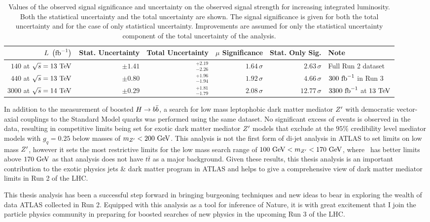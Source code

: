 \begin{table}[htbp]
 \centering
 \caption[Values of the observed signal significance and uncertainty on the observed signal strength for increasing integrated luminosity.]{%
  Values of the observed signal significance and uncertainty on the observed signal strength for increasing integrated luminosity.
  Both the statistical uncertainty and the total uncertainty are shown.
  The signal significance is given for both the total uncertainty and for the case of only statistical uncertainty.
  Improvements are assumed for only the statistical uncertainty component of the total uncertainty of the analysis.}
 \label{table:signal_significance_lumi_scaling}
 \begin{adjustbox}{max width=\textwidth}
  \begin{tabular}{@{}rrrrrl@{}} \toprule
   $L~\left(\mathrm{fb}^{-1}\right)$        & Stat. Uncertainty & Total Uncertainty  & $\mu$ Significance & Stat. Only Sig. & Note                     \\ \midrule
   $140$ at $\sqrt{s}=13~\mathrm{TeV}$  & $\pm1.41$         & $_{-2.26}^{+2.19}$ & $1.64\,\sigma$     & $2.63\,\sigma$  & Full Run 2 dataset       \\
   $440$ at $\sqrt{s}=13~\mathrm{TeV}$  & $\pm0.80$         & $_{-1.94}^{+1.96}$ & $1.92\,\sigma$     & $4.66\,\sigma$  & $300~\mathrm{fb}^{-1}$ in Run 3      \\
   $3000$ at $\sqrt{s}=14~\mathrm{TeV}$ & $\pm0.29$         & $_{-1.79}^{+1.81}$ & $2.08\,\sigma$     & $12.77\,\sigma$ & $3300~\mathrm{fb}^{-1}$ at $13~\mathrm{TeV}$ \\
   \bottomrule
  \end{tabular}
 \end{adjustbox}
\end{table}

In addition to the measurement of boosted $H \to b\bar{b}$, a search for low mass leptophobic dark matter mediator $Z^{\prime}$ with democratic vector-axial couplings to the Standard Model quarks was performed using the same dataset.
No significant excess of events is observed in the data, resulting in competitive limits being set for exotic dark matter mediator $Z^{\prime}$ models that exclude at the $95\%$ credibility level mediator models with $g_{q} = 0.25$ below masses of $m_{Z^{\prime}} < 200~\mathrm{GeV}$.
This analysis is not the first form of di-jet analysis in ATLAS to set limits on low mass $Z^{\prime}$, however it sets the most restrictive limits for the low mass search range of $100~\mathrm{GeV} < m_{Z^{\prime}} <170~\mathrm{GeV}$, where~\cite{EXOT-2017-01} has better limits above $170~\mathrm{GeV}$ as that analysis does not have $t\bar{t}$ as a major background.
Given these results, this thesis analysis is an important contribution to the exotic physics jets \& dark matter program in ATLAS and helps to give a comprehensive view of dark matter mediator limits in Run 2 of the LHC.

This thesis analysis has been a successful step forward in bringing burgeoning techniques and new ideas to bear in exploring the wealth of data ATLAS collected in Run 2.
Equipped with this analysis as a tool for inference of Nature, it is with great excitement that I join the particle physics community in preparing for boosted searches of new physics in the upcoming Run 3 of the LHC.
